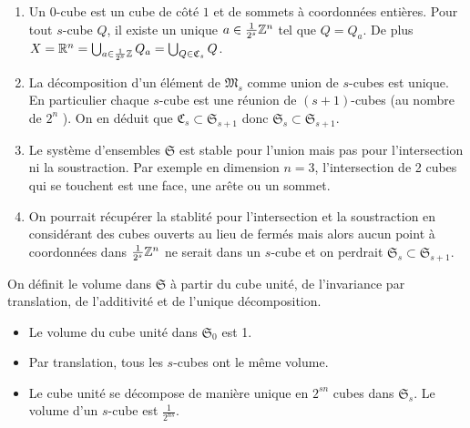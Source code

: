 \begin{rems}
 \begin{enumerate}
  \item Un $0$-cube est un cube de côté $1$ et de sommets à coordonnées entières.  Pour tout $s$-cube $Q$, il existe un unique $a\in \frac{1}{2^s}\mathbb{Z}^n$ tel que $Q=Q_a$. De plus $X = \mathbb{R}^n = \bigcup_{a\in \frac{1}{2^s}\mathbb{Z}}Q_a = \bigcup_{Q\in \mathfrak{C}_s}Q$.
  \item La décomposition d'un élément de $\mathfrak{M}_s$ comme union de $s$-cubes est unique. En particulier chaque $s$-cube est une réunion de $(s+1)$-cubes (au nombre de $2^n$ ). On en déduit que $\mathfrak{C}_s \subset \mathfrak{S}_{s+1}$ donc $\mathfrak{S}_s \subset \mathfrak{S}_{s+1}$.
  \item Le système d'ensembles $\mathfrak{S}$ est stable pour l'union mais pas pour l'intersection ni la soustraction. Par exemple en dimension $n=3$, l'intersection de 2 cubes qui se touchent est une face, une arête ou un sommet.
  \item On pourrait récupérer la stablité pour l'intersection et la soustraction en considérant des cubes ouverts au lieu de fermés mais alors aucun point à coordonnées dans $\frac{1}{2^s}\mathbb{Z}^n$ ne serait dans un $s$-cube et on perdrait $\mathfrak{S}_s \subset \mathfrak{S}_{s+1}$.
 \end{enumerate}
\end{rems}

On définit le volume dans $\mathfrak{S}$ à partir du cube unité, de l'invariance par translation, de l'additivité et de l'unique décomposition.
\begin{itemize}
 \item Le volume du cube unité dans $\mathfrak{S}_0$ est 1.
 \item Par translation, tous les $s$-cubes ont le même volume.
 \item Le cube unité se décompose de manière unique en $2^{sn}$ cubes dans $\mathfrak{S}_s$. Le volume d'un $s$-cube est $\frac{1}{2^{ns}}$.
\end{itemize}

